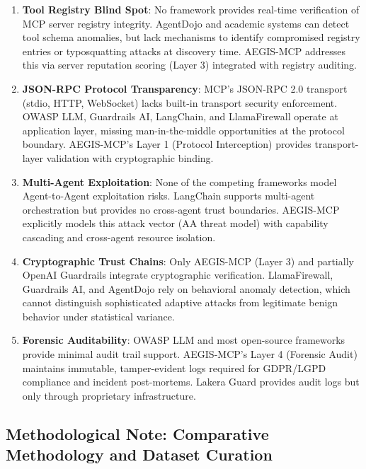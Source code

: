 \documentclass[12pt,twocolumn,journal]{IEEEtran}
\begin{document}
\begin{enumerate}

\item \textbf{Tool Registry Blind Spot}: No framework provides real-time verification of MCP server registry integrity. AgentDojo and academic systems can detect tool schema anomalies, but lack mechanisms to identify compromised registry entries or typosquatting attacks at discovery time. AEGIS-MCP addresses this via server reputation scoring (Layer 3) integrated with registry auditing.

\item \textbf{JSON-RPC Protocol Transparency}: MCP's JSON-RPC 2.0 transport (stdio, HTTP, WebSocket) lacks built-in transport security enforcement. OWASP LLM, Guardrails AI, LangChain, and LlamaFirewall operate at application layer, missing man-in-the-middle opportunities at the protocol boundary. AEGIS-MCP's Layer 1 (Protocol Interception) provides transport-layer validation with cryptographic binding.

\item \textbf{Multi-Agent Exploitation}: None of the competing frameworks model Agent-to-Agent exploitation risks. LangChain supports multi-agent orchestration but provides no cross-agent trust boundaries. AEGIS-MCP explicitly models this attack vector (AA threat model) with capability cascading and cross-agent resource isolation.

\item \textbf{Cryptographic Trust Chains}: Only AEGIS-MCP (Layer 3) and partially OpenAI Guardrails integrate cryptographic verification. LlamaFirewall, Guardrails AI, and AgentDojo rely on behavioral anomaly detection, which cannot distinguish sophisticated adaptive attacks from legitimate benign behavior under statistical variance.

\item \textbf{Forensic Auditability}: OWASP LLM and most open-source frameworks provide minimal audit trail support. AEGIS-MCP's Layer 4 (Forensic Audit) maintains immutable, tamper-evident logs required for GDPR/LGPD compliance and incident post-mortems. Lakera Guard provides audit logs but only through proprietary infrastructure.

\end{enumerate}

\subsection{Methodological Note: Comparative Methodology and Dataset Curation}
\end{document}
